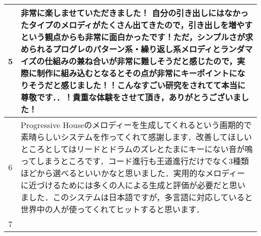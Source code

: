 \begin{table}[htbp]
\begin{center}
\begin{tabular}{|c|p{30em}|}
      5 & 非常に楽しませていただきました！
      自分の引き出しにはなかったタイプのメロディがたくさん出てきたので，引き出しを増やすという観点からも非常に面白かったです！ただ，シンプルさが求められるプログレのパターン系・繰り返し系メロディとランダマイズの仕組みの兼ね合いが非常に難しそうだと感じたので，実際に制作に組み込むとなるとその点が非常にキーポイントになりそうだと感じました！！こんなすごい研究をされてて本当に尊敬です．．！貴重な体験をさせて頂き，ありがとうございました！ \\ \hline
      6 & Progressive Houseのメロディーを生成してくれるという画期的で素晴らしいシステムを作ってくれて感謝します．改善してほしいところとしてはリードとドラムのズレとたまにキーにない音が鳴ってしまうところです．コード進行も王道進行だけでなく3種類ほどから選べるといいかなと思いました．実用的なメロディーに近づけるためには多くの人による生成と評価が必要だと思いました．このシステムは日本語ですが，多言語に対応していると世界中の人が使ってくれてヒットすると思います． \\ \hline
      7 &  \\ \hline
    \end{tabular}
  \end{center}
\end{table}